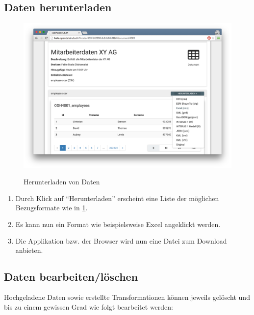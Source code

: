 \subsection{Daten herunterladen}

\begin{figure}[H]
	\centering
	\includegraphics[width=\linewidth]{fig/screenshot-daten-herunterladen}
	\label{fig:sd:screenshot-daten-herunterladen}
	\caption{Herunterladen von Daten}
\end{figure}

\begin{enumerate}

\item Durch Klick auf ``Herunterladen'' erscheint eine Liste der möglichen Bezugsformate wie in \cref{fig:sd:screenshot-daten-herunterladen}.
\item Es kann nun ein Format wie beispielsweise Excel angeklickt werden.
\item Die Applikation bzw. der Browser wird nun eine Datei zum Download anbieten.
\end{enumerate}


\subsection{Daten bearbeiten/löschen}

Hochgeladene Daten sowie erstellte Transformationen können jeweils gelöscht und bis zu einem gewissen Grad wie folgt bearbeitet werden:

